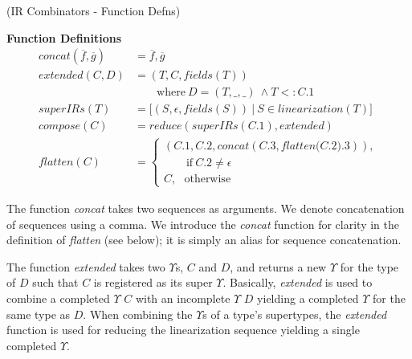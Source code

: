 \begin{defn}{(IR Combinators - Function Defns)}

\vspace{1em}

{\bf Function Definitions}
{\small
\begin{align*}
\textit{concat}(\overline{f}, \overline{g})& = \overline{f}, \overline{g}\\
\textit{extended}(C, D)&                     = (T, C, \textit{fields}(T))\\
                       &                       \qquad \mbox{where}~D = (T, \_, \_)~\land T <: C.1\\
\textit{superIRs}(T)&                        = \lbrack(S, \epsilon, \textit{fields}(S))~|~S\in \textit{linearization}(T)\rbrack\\
\textit{compose}(C)&                         = \textit{reduce}(\textit{superIRs}(C.1),\textit{extended})\\
\textit{flatten}(C)&                         =\left\{ \begin{array}{l}
                                                (C.1, C.2, \textit{concat}(C.3, \textit{flatten(C.2).3})),\\
                                                \qquad\mbox{if}~C.2\neq\epsilon\\
                                                C,~~~\mbox{otherwise}
                                              \end{array} \right.
\end{align*}
}%


The function \textit{concat} takes two sequences as arguments. We
denote concatenation of sequences using a comma. We introduce the
\textit{concat} function for clarity in the definition of \textit{flatten}
(see below); it is simply an alias for sequence concatenation.





The function \textit{extended} takes two $\Upsilon$s, $C$ and $D$, and returns a new
$\Upsilon$ for the type of $D$ such that $C$ is registered as its super $\Upsilon$.
Basically, \textit{extended} is used to combine a completed $\Upsilon$ $C$ with an
incomplete $\Upsilon$ $D$ yielding a completed $\Upsilon$ for the same type as $D$. When
combining the $\Upsilon$s of a type's supertypes, the \textit{extended} function is
used for reducing the linearization sequence yielding a single completed $\Upsilon$.


\end{defn}
